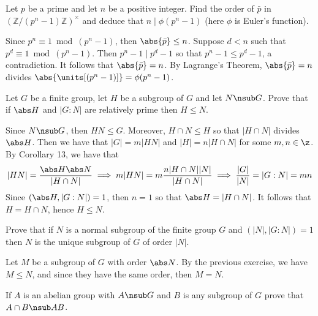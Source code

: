 \begin{exercise}\label{ex3.2.17}
    Let $p$ be a prime and let $n$ be a positive integer. Find the order of $\bar p$ in $(\mathbb{Z}/(p^n - 1)\mathbb{Z})^\times$ and deduce that $n \mid \phi(p^n - 1)$ (here $\phi$ is Euler's function).
\end{exercise}

\begin{sol}
    Since $p^n \equiv 1 \bmod (p^n - 1)$, then $\abs{\bar p} \leq n$. Suppose $d < n$ such that $p^d \equiv 1 \bmod (p^n - 1)$. Then $p^n - 1 \mid p^d - 1$ so that $p^n - 1 \leq p^d - 1$, a contradiction. It follows that $\abs{\bar p} = n$. By Lagrange's Theorem, $\abs{\bar p} = n$ divides $\abs{\units[(p^n - 1)]} = \phi(p^n - 1)$.
\end{sol}

\newpage

\begin{exercise}\label{ex3.2.18}
    Let $G$ be a finite group, let $H$ be a subgroup of $G$ and let $N \nsub G$. Prove that if $\abs H$ and $|G : N|$ are relatively prime then $H \leq N$.
\end{exercise}

\begin{sol}
    Since $N \nsub G$, then $HN \leq G$. Moreover, $H \cap N \leq H$ so that $|H \cap N|$ divides $\abs H$. Then we have that $|G| = m|HN|$ and $|H| = n|H \cap N|$ for some $m, n \in \z$. By Corollary 13, we have that
    \[|HN| = \frac{\abs H \abs N}{|H \cap N|} \implies m|HN| = m\frac{n|H \cap N||N|}{|H \cap N|} \implies \frac{|G|}{|N|} = |G : N| = mn\]
    Since $(\abs H, |G : N|) = 1$, then $n = 1$ so that $\abs H = |H \cap N|$. It follows that $H = H \cap N$, hence $H \leq N$.
\end{sol}

\begin{exercise}\label{ex3.2.19}
    Prove that if $N$ is a normal subgroup of the finite group $G$ and $(|N|, |G : N|) = 1$ then $N$ is the unique subgroup of $G$ of order $|N|$.
\end{exercise}

\begin{sol}
    Let $M$ be a subgroup of $G$ with order $\abs N$. By the previous exercise, we have $M \leq N$, and since they have the same order, then $M = N$.
\end{sol}

\begin{specialexercise}\label{ex3.2.20}
    If $A$ is an abelian group with $A \nsub G$ and $B$ is any subgroup of $G$ prove that $A \cap B \nsub AB$.
\end{specialexercise}

